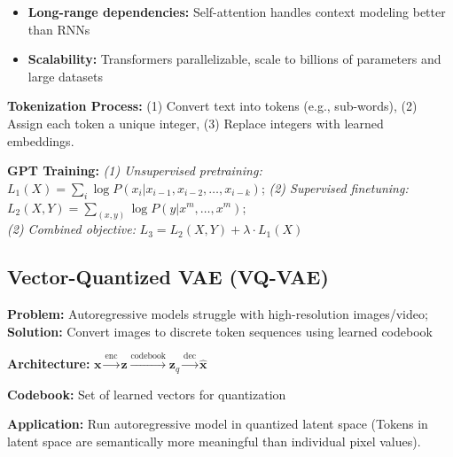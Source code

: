 \begin{itemize}
    \item \textbf{Long-range dependencies:} Self-attention handles context modeling better than RNNs
    \item \textbf{Scalability:} Transformers parallelizable, scale to billions of parameters and large datasets
\end{itemize}

\textbf{Tokenization Process:} (1) Convert text into tokens (e.g., sub-words), (2) Assign each token a unique integer, (3) Replace integers with learned embeddings.

\textbf{GPT Training:} {\small \textit{(1) Unsupervised pretraining:} $L_1(X) = \sum_i \log P(x_i | x_{i-1}, x_{i-2}, \ldots, x_{i-k})$; \textit{(2) Supervised finetuning:} $L_2(X,Y) = \sum_{(x,y)} \log P(y | x^m, \ldots, x^m)$; \\ \textit{(2) Combined objective:} $L_3 = L_2(X,Y) + \lambda \cdot L_1(X)$}

\subsection{Vector-Quantized VAE (VQ-VAE)}

\textbf{Problem:} Autoregressive models struggle with high-resolution images/video; 
\textbf{Solution:} Convert images to discrete token sequences using learned codebook

\textbf{Architecture:} $\mathbf{x} \xrightarrow{\text{enc}} \mathbf{z} \xrightarrow{\text{codebook}} \mathbf{z}_q \xrightarrow{\text{dec}} \hat{\mathbf{x}}$

\textbf{Codebook:} Set of learned vectors for quantization

\textbf{Application:} Run autoregressive model in quantized latent space (Tokens in latent space are semantically more meaningful than individual pixel values).
